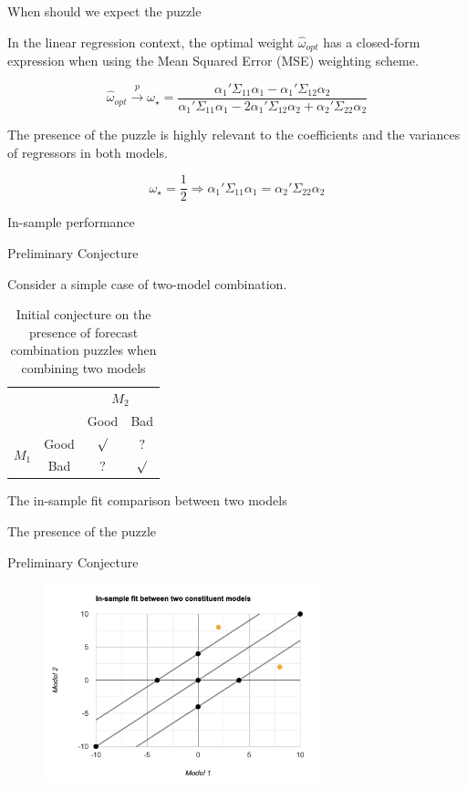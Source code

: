 \begin{frame}{When should we expect the puzzle}

    In the linear regression context, the optimal weight $\hat\omega_{opt}$ has a closed-form expression when using the Mean Squared Error (MSE) weighting scheme.
    
    
    \[\hat\omega_{opt} \overset{p}{\to} \omega_\star = \frac{\alpha_1'\Sigma_{11}\alpha_1 - \alpha_1'\Sigma_{12}\alpha_2}{\alpha_1'\Sigma_{11}\alpha_1 - 2\alpha_1'\Sigma_{12}\alpha_2 + \alpha_2'\Sigma_{22}\alpha_2}\]


    The presence of the puzzle is highly relevant to the coefficients and the variances of regressors in both models.
    
    
    \[\omega_\star=\frac{1}{2} \Rightarrow \alpha_1'\Sigma_{11}\alpha_1 = \alpha_2'\Sigma_{22}\alpha_2\]

    In-sample performance

    
\end{frame}




\begin{frame}{Preliminary Conjecture}

    Consider a simple case of two-model combination.

    \begin{table}[ht]
    \centering
    \begin{tabular}{cccc}
                           &      & \multicolumn{2}{c}{$M_2$} \\
                           &      & Good       & Bad       \\
    \multirow{2}{*}{$M_1$} & Good & $\surd$    & $?$ \\
                           & Bad  & $?$        & $\surd$
    \end{tabular}
    \label{tab:1}
    \caption{Initial conjecture on the presence of forecast combination puzzles when combining two models}
    \end{table}
    
    \hspace*{20pt} The in-sample fit comparison between two models 
    
    \hspace*{20pt} The presence of the puzzle


\end{frame}


\begin{frame}{Preliminary Conjecture}

\begin{figure}
    \centering
    \includegraphics[width=8cm]{Graph/Conjecture.png}
    \label{fig:enter-label}
\end{figure}


\end{frame}





